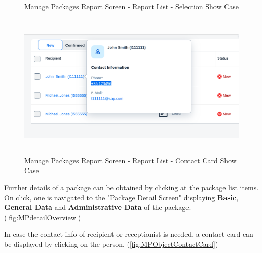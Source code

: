\begin{figure}[H]
	\centering
	\hspace{5pt}
    \caption{Manage Packages Report Screen - Report List - Selection Show Case}
	\label{fig:MPListSelection}
\end{figure}

\begin{figure}[H]
	\centering
	\includegraphics[height=200pt]{images/user_doc/managePack/ReportScreen/browse/contactcard.png}
	\caption{Manage Packages Report Screen - Report List - Contact Card Show Case}
	\label{fig:MPReportCOntactCard}
\end{figure}

Further details of a package can be obtained by clicking at the package list items. On click, one is navigated to the "Package Detail Screen" displaying \textbf{Basic}, \textbf{General Data} and \textbf{Administrative Data} of the package. (\autoref{fig:MPdetailOverview})

In case the contact info of recipient or receptionist is needed, a contact card can be displayed by clicking on the person. (\autoref{fig:MPObjectContactCard})

